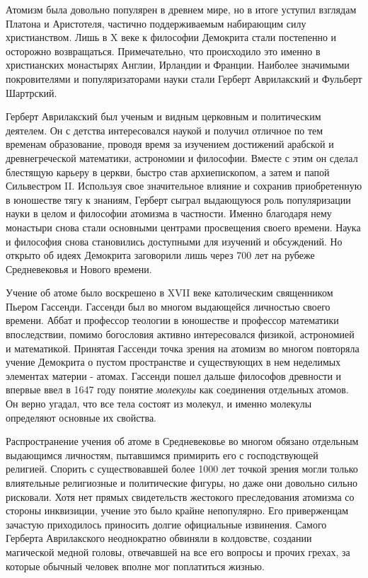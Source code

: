 Атомизм была довольно популярен в древнем мире, но в итоге уступил взглядам Платона и Аристотеля, частично поддерживаемым набирающим силу христианством.
Лишь в X веке к философии Демокрита стали постепенно и осторожно возвращаться.
Примечательно, что происходило это именно в христианских монастырях Англии, Ирландии и Франции.
Наиболее значимыми покровителями и популяризаторами науки стали Герберт Аврилакский и Фульберт Шартрский.

Герберт Аврилакский был ученым и видным церковным и политическим деятелем.
Он с детства интересовался наукой и получил отличное по тем временам образование, проводя время за изучением достижений арабской и древнегреческой математики, астрономии и философии.
Вместе с этим он сделал блестящую карьеру в церкви, быстро став архиепископом, а затем и папой Сильвестром II.
Используя свое значительное влияние и сохранив приобретенную в юношестве тягу к знаниям, Герберт сыграл выдающуюся роль популяризации науки в целом и философии атомизма в частности.
Именно благодаря нему монастыри снова стали основными центрами просвещения своего времени.
Наука и философия снова становились доступными для изучений и обсуждений.
Но открыто об идеях Демокрита заговорили лишь через 700 лет на рубеже Средневековья и Нового времени.

Учение об атоме было воскрешено в XVII веке католическим священником Пьером Гассенди. 
Гассенди был во многом выдающейся личностью своего времени. 
Аббат и профессор теологии в юношестве и профессор математики впоследствии, помимо богословия активно интересовался физикой, астрономией и математикой. 
Принятая Гассенди точка зрения на атомизм во многом повторяла учение Демокрита о пустом пространстве и существующих в нем неделимых элементах материи - атомах. 
Гассенди пошел дальше философов древности и впервые ввел в 1647 году понятие \textit{молекулы} как соединения отдельных атомов. 
Он верно угадал, что все тела состоят из молекул, и именно молекулы определяют основные их свойства. 

Распространение учения об атоме в Средневековье во многом обязано отдельным выдающимся личностям, пытавшимся примирить его с господствующей религией.
Спорить с существовавшей более 1000 лет точкой зрения могли только влиятельные религиозные и политические фигуры, но даже они довольно сильно рисковали.
Хотя нет прямых свидетельств жестокого преследования атомизма со стороны инквизиции, учение это было крайне непопулярно.
Его приверженцам зачастую приходилось приносить долгие официальные извинения.
Самого Герберта Аврилакского неоднократно обвиняли в колдовстве, создании магической медной головы, отвечавшей на все его вопросы и прочих грехах, за которые обычный человек вполне мог поплатиться жизнью.

